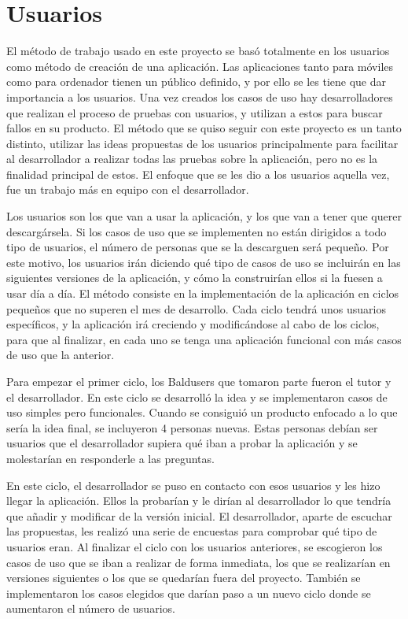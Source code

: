 \chapter{Usuarios}
\label{ch:Usuarios}



El método de trabajo usado en este proyecto se basó totalmente en los usuarios como método de creación de una aplicación. Las aplicaciones tanto para móviles como para ordenador tienen un público definido, y por ello se les tiene que dar importancia a los usuarios.
Una vez creados los casos de uso hay desarrolladores que realizan el proceso de pruebas con usuarios, y utilizan a estos para buscar fallos en su producto. El método que se quiso seguir con este proyecto es un tanto distinto, utilizar las ideas propuestas de los usuarios principalmente para facilitar al desarrollador a realizar todas las pruebas sobre la aplicación, pero no es la finalidad principal de estos. El enfoque que se les dio a los usuarios aquella vez, fue un trabajo más en equipo con el desarrollador.

Los usuarios son los que van a usar la aplicación, y los que van a tener que querer descargársela. Si los casos de uso que se implementen no están dirigidos a todo tipo de usuarios, el número de personas que se la descarguen será pequeño.
Por este motivo, los usuarios irán diciendo qué tipo de casos de uso se incluirán en las siguientes versiones de la aplicación, y cómo la construirían ellos si la fuesen a usar día a día.
El método consiste en la implementación de la aplicación en ciclos pequeños que no superen el mes de desarrollo.
Cada ciclo tendrá unos usuarios específicos, y la aplicación irá creciendo y modificándose al cabo de los ciclos, para que al finalizar, en cada uno se tenga una aplicación funcional con más casos de uso que la anterior.

Para empezar el primer ciclo, los Baldusers que tomaron parte fueron el tutor y el desarrollador.
En este ciclo se desarrolló la idea y se implementaron casos de uso simples pero funcionales.
Cuando se consiguió un producto enfocado a lo que sería la idea final, se incluyeron 4 personas nuevas. Estas personas debían ser usuarios que el desarrollador supiera qué iban a probar la aplicación y se molestarían en responderle a las preguntas. 

En este ciclo, el desarrollador se puso en contacto con esos usuarios y les hizo llegar la aplicación. Ellos la probarían y le dirían al desarrollador lo que tendría que añadir y modificar de la versión inicial. El desarrollador, aparte de escuchar las propuestas, les realizó una serie de encuestas para comprobar qué tipo de usuarios eran.
Al finalizar el ciclo con los usuarios anteriores, se escogieron los casos de uso que se iban a realizar de forma inmediata, los que se realizarían en versiones siguientes o los que se quedarían fuera del proyecto.
También se implementaron los casos elegidos que darían paso a un nuevo ciclo donde se aumentaron el número de usuarios.

